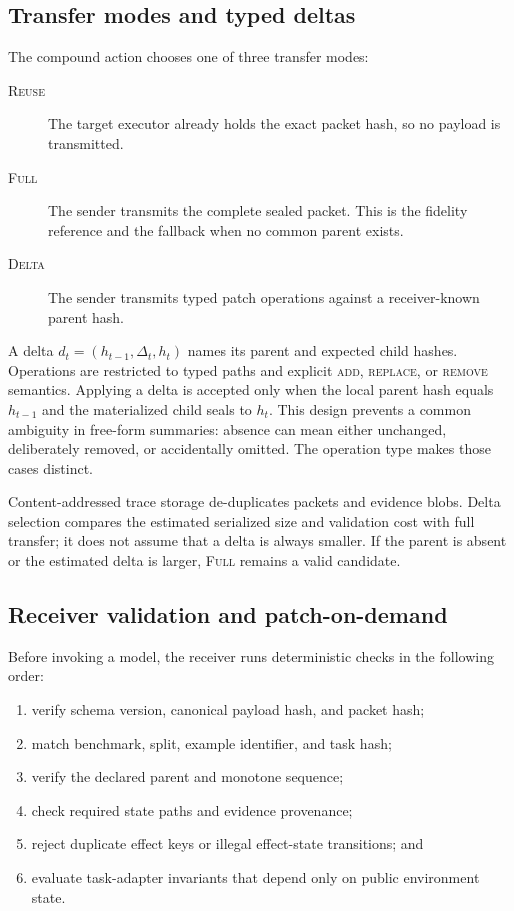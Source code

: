 \documentclass[10pt]{article}
\newcommand{\methodtag}[1]{\textsc{#1}}
\begin{document}
\subsection{Transfer modes and typed deltas}
\label{sec:delta}

The compound action chooses one of three transfer modes:
\begin{description}
  \item[\methodtag{Reuse}] The target executor already holds the exact packet
  hash, so no payload is transmitted.
  \item[\methodtag{Full}] The sender transmits the complete sealed packet.
  This is the fidelity reference and the fallback when no common parent exists.
  \item[\methodtag{Delta}] The sender transmits typed patch operations against
  a receiver-known parent hash.
\end{description}

A delta $d_t=(h_{t-1},\Delta_t,h_t)$ names its parent and expected child
hashes. Operations are restricted to typed paths and explicit
\textsc{add}, \textsc{replace}, or \textsc{remove} semantics. Applying a
delta is accepted only when the local parent hash equals $h_{t-1}$ and the
materialized child seals to $h_t$. This design prevents a common ambiguity in
free-form summaries: absence can mean either unchanged, deliberately removed,
or accidentally omitted. The operation type makes those cases distinct.

Content-addressed trace storage de-duplicates packets and evidence blobs.
Delta selection compares the estimated serialized size and validation cost
with full transfer; it does not assume that a delta is always smaller. If the
parent is absent or the estimated delta is larger, \methodtag{Full} remains a
valid candidate.

\subsection{Receiver validation and patch-on-demand}
\label{sec:validation}

Before invoking a model, the receiver runs deterministic checks in the
following order:
\begin{enumerate}
  \item verify schema version, canonical payload hash, and packet hash;
  \item match benchmark, split, example identifier, and task hash;
  \item verify the declared parent and monotone sequence;
  \item check required state paths and evidence provenance;
  \item reject duplicate effect keys or illegal effect-state transitions; and
  \item evaluate task-adapter invariants that depend only on public
  environment state.
\end{enumerate}
\end{document}
